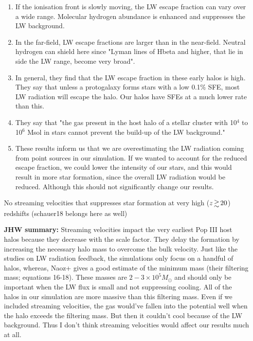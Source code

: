 \documentclass[a4paper,fleqn,usenatbib]{mnras}
\begin{document}
\begin{enumerate}
	\item If the ionisation front is slowly moving, the LW escape fraction can vary over a wide range. Molecular hydrogen abundance is enhanced and suppresses the LW background.
	\item In the far-field, LW escape fractions are larger than in the near-field. Neutral hydrogen can shield here since "Lyman lines of Hbeta and higher, that lie in side the LW range, become very broad". 
	\item In general, they find that the LW escape fraction in these early halos is high. They say that unless a protogalaxy forms stars with a low 0.1\% SFE, most LW radiation will escape the halo. Our halos have SFEs at a much lower rate than this.
	\item They say that "the gas present in the host halo of a stellar cluster with 10$^{4}$ to 10$^{6}$ Msol in stars cannot prevent the build-up of the LW background."
	\item These results inform us that we are overestimating the LW radiation coming from point sources in our simulation. If we wanted to account for the reduced escape fraction, we could lower the intensity of our stars, and this would result in more star formation, since the overall LW radiation would be reduced. Although this should not significantly change our results.
\end{enumerate}

\li No streaming velocities that suppresses star formation at very
high ($z \ga 20$) redshifts \citep{Tselia11, Greif11_Delay, Naoz12, OLeary12} (schauer18 belongs here as well)

\noindent\textbf{JHW summary:} Streaming velocities impact the very earliest Pop III host halos because they decrease with the scale factor.  They delay the formation by increasing the necessary halo mass to overcome the bulk velocity.  Just like the studies on LW radiation feedback, the simulations only focus on a handful of halos, whereas, Naoz+ gives a good estimate of the minimum mass (their filtering mass; equations 16-18).  These masses are $2-3 \times 10^5 M_\odot$ and should only be important when the LW flux is small and not suppressing cooling.  All of the halos in our simulation are more massive than this filtering mass.  Even if we included streaming velocities, the gas would've fallen into the potential well when the halo exceeds the filtering mass.  But then it couldn't cool because of the LW background.  Thus I don't think streaming velocities would affect our results much at all.
\end{document}
